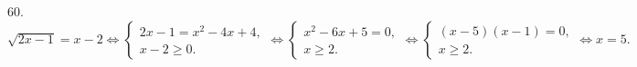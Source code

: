 60. $\sqrt{2x-1}=x-2\Leftrightarrow\begin{cases} 2x-1=x^2-4x+4,\\ x-2\geqslant0.\end{cases}\Leftrightarrow\begin{cases} x^2-6x+5=0,\\ x\geqslant2.\end{cases}
\Leftrightarrow\begin{cases} (x-5)(x-1)=0,\\ x\geqslant2.\end{cases}\Leftrightarrow x=5.$\\
